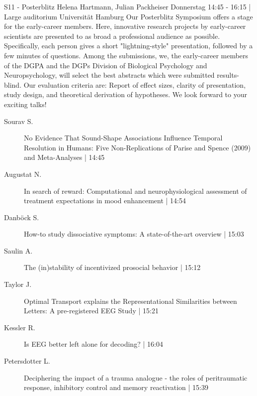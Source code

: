 
            \begin{symposium}
            {S11 - Posterblitz}
            {Helena Hartmann, Julian Packheiser}
            {Donnerstag 14:45 - 16:15 | Large auditorium}
            {Universität Hamburg}
            Our Posterblitz Symposium offers a stage for the early-career members. Here, innovative research projects by early-career scientists are presented to as broad a professional audience as possible. Specifically, each person gives a short "lightning-style" presentation, followed by a few minutes of questions. Among the submissions, we, the early-career members of the DGPA and the DGPs Division of Biological Psychology and Neuropsychology, will select the best abstracts which were submitted results-blind. Our evaluation criteria are: Report of effect sizes, clarity of presentation, study design, and theoretical derivation of hypotheses. We look forward to your exciting talks! 
            \begin{description}    
            
                \item [ Sourav S.] No Evidence That Sound-Shape Associations Influence Temporal Resolution in Humans: Five Non-Replications of Parise and Spence (2009) and Meta-Analyses \textcolor{mygray}{ | 14:45}    
                
                \item [ Augustat N.] In search of reward: Computational and neurophysiological assessment of treatment expectations in mood enhancement \textcolor{mygray}{ | 14:54}    
                
                \item [ Danböck S.] How-to study dissociative symptoms: A state-of-the-art overview \textcolor{mygray}{ | 15:03}    
                
                \item [ Saulin A.] The (in)stability of incentivized prosocial behavior \textcolor{mygray}{ | 15:12}    
                
                \item [ Taylor J.] Optimal Transport explains the Representational Similarities between Letters: A pre-registered EEG Study \textcolor{mygray}{ | 15:21}    
                
                \item [ Kessler R.] Is EEG better left alone for decoding? \textcolor{mygray}{ | 16:04}    
                
                \item [ Petersdotter L.] Deciphering the impact of a trauma analogue - the roles of peritraumatic response, inhibitory control and memory reactivation \textcolor{mygray}{ | 15:39}    
                

\end{description}
\end{symposium}
